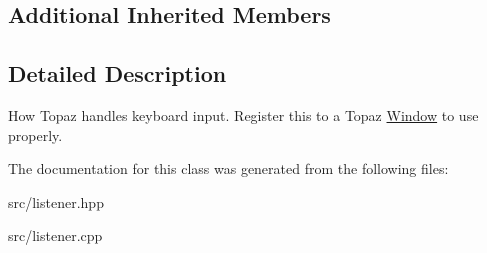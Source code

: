 \subsection*{Additional Inherited Members}


\subsection{Detailed Description}
How Topaz handles keyboard input. Register this to a Topaz \mbox{\hyperlink{class_window}{Window}} to use properly. 

The documentation for this class was generated from the following files\+:\begin{DoxyCompactItemize}
\item 
src/listener.\+hpp\item 
src/listener.\+cpp\end{DoxyCompactItemize}
